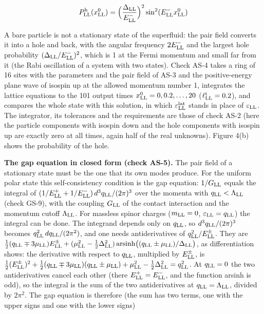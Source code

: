 \documentclass[
  10pt,
]{article}
\begin{document}
\[P^{\rm h}_{\rm LL}(x^0_{\rm LL})=\Big(\frac{\Delta_{\rm LL}}{E^-_{\rm LL}}\Big)^2\sin^2(E^-_{\rm LL}x^0_{\rm LL})\]

A bare particle is not a stationary state of the superfluid: the pair
field converts it into a hole and back, with the angular frequency
\(2E^-_{\rm LL}\) and the largest hole probability
\((\Delta_{\rm LL}/E^-_{\rm LL})^2\), which is 1 at the Fermi momentum
and small far from it (the Rabi oscillation of a system with two
states). Check AS-4 takes a ring of 16 sites with the parameters and the
pair field of AS-3 and the positive-energy plane wave of isospin up at
the allowed momentum number 1, integrates the lattice equations to the
101 output times \(x^0_{\rm LL}=0,0.2,\dots,20\)
(\(\ell^{\rm t}_{\rm LL}=0.2\)), and compares the whole state with this
solution, in which \(\varepsilon^{\rm lat}_{\rm LL}\) stands in place of
\(\varepsilon_{\rm LL}\). The integrator, its tolerances and the
requirements are those of check AS-2 (here the particle components with
isospin down and the hole components with isospin up are exactly zero at
all times, again half of the real unknowns). Figure 4(b) shows the
probability of the hole.

\textbf{The gap equation in closed form (check AS-5).} The pair field of
a stationary state must be the one that its own modes produce. For the
uniform polar state this self-consistency condition is the gap equation:
\(1/G_{\rm LL}\) equals the integral of
\((1/E^+_{\rm LL}+1/E^-_{\rm LL})\,d^3q_{\rm LL}/(2\pi)^3\) over the
momenta with \(q_{\rm LL}<\Lambda_{\rm LL}\) (check GS-9), with the
coupling \(G_{\rm LL}\) of the contact interaction and the momentum
cutoff \(\Lambda_{\rm LL}\). For massless spinor charges
(\(m_{\rm LL}=0\), \(\varepsilon_{\rm LL}=q_{\rm LL}\)) the integral can
be done. The integrand depends only on \(q_{\rm LL}\), so
\(d^3q_{\rm LL}/(2\pi)^3\) becomes
\(q_{\rm LL}^2\,dq_{\rm LL}/(2\pi^2)\), and one needs antiderivatives of
\(q_{\rm LL}^2/E^\pm_{\rm LL}\). They are
\(\tfrac12(q_{\rm LL}\mp3\mu_{\rm LL})E^\pm_{\rm LL}+(\mu_{\rm LL}^2-\tfrac12\Delta_{\rm LL}^2)\,\mathrm{arsinh}\big((q_{\rm LL}\pm\mu_{\rm LL})/\Delta_{\rm LL}\big)\),
as differentiation shows: the derivative with respect to \(q_{\rm LL}\),
multiplied by \(E^\pm_{\rm LL}\), is
\(\tfrac12(E^\pm_{\rm LL})^2+\tfrac12(q_{\rm LL}\mp3\mu_{\rm LL})(q_{\rm LL}\pm\mu_{\rm LL})+\mu_{\rm LL}^2-\tfrac12\Delta_{\rm LL}^2=q_{\rm LL}^2\).
At \(q_{\rm LL}=0\) the two antiderivatives cancel each other (there
\(E^+_{\rm LL}=E^-_{\rm LL}\), and the function arsinh is odd), so the
integral is the sum of the two antiderivatives at
\(q_{\rm LL}=\Lambda_{\rm LL}\), divided by \(2\pi^2\). The gap equation
is therefore (the sum has two terms, one with the upper signs and one
with the lower signs)
\end{document}
